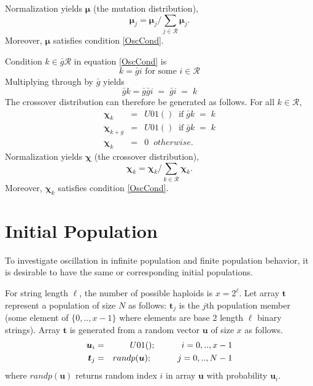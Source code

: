 Normalization yields $\bm{\mu}$ (the mutation distribution),
\[
\bm{\mu}_j = \bm{\mu}_j / \sum \limits_{j \in \mathcal{R} } \bm{\mu}_j.
\]
Moreover, $\bm{\mu}$ satisfies condition \ref{OscCond}.

Condition $k \in \bar{g} \mathcal{R}$ in equation \ref{OscCond} is
\[
k = \bar{g} i  \text{ for some $i \in \mathcal{R}$}
\]
Multiplying through by $\bar{g}$ yields
\begin{equation*}
\bar{g} k = \bar{g} \bar{g} i \; = \; \bar{g} i \; = \; k 
\end{equation*}
The crossover distribution can therefore be generated as follows.
For all $k \in \mathcal{R}$,
\begin{eqnarray*}
\bm{\chi}_k & = & U01() \;\; \mbox{if}\; \bar{g}k \;=\; k \\
\bm{\chi}_{k+g} & = & U01() \;\; \mbox{if}\; \bar{g}k \;=\; k\\
\bm{\chi}_k & = & 0  \;\; otherwise.
\end{eqnarray*} 
Normalization yields 
$\bm{\chi}$ (the crossover distribution),
\[
\bm{\chi}_k = \bm{\chi}_k/\sum\limits_{k \in \mathcal{R}} \bm{\chi}_k.
\]
Moreover, $\bm{\chi}_k$ satisfies condition \ref{OscCond}.

\section{Initial Population}
\label{InitPopOsc}

To investigate oscillation in infinite population and finite population behavior, 
it is desirable to have the same or corresponding initial populations. 

For string length $\ell$, the number of possible haploids is $x = 2^\ell$. Let array $\bm{t}$ represent a  
population of size $N$ as follows: $\bm{t}_j$ is the $j$th population member (some element of $\{0,..,x-1\}$ 
where elements are base 2 length $\ell$ binary strings). Array $\bm{t}$ is generated from a random vector $\bm{u}$ of size $x$ as follows. 
\begin{eqnarray*}
\bm{u}_i & = & U01(); \hspace{30pt} {i = 0,.., x-1} \\
\bm{t}_j & = & randp(\bm{u}) ; \hspace{30pt} {j = 0,.., N-1}
\end{eqnarray*}
where $randp(\bm{u})$ returns random index $i$ in array $\bm{u}$ with probability $\bm{u}_i$.

